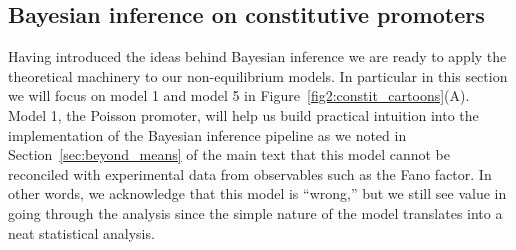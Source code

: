 
\subsection{Bayesian inference on constitutive promoters}
\label{sec:si_bayes_unreg}

Having introduced the ideas behind Bayesian inference we are ready to apply the
theoretical machinery to our non-equilibrium models. In particular in this
section we will focus on model 1 and model 5 in
Figure~\ref{fig2:constit_cartoons}(A). Model 1, the Poisson promoter, will help
us build practical intuition into the implementation of the Bayesian inference
pipeline as we noted in Section~\ref{sec:beyond_means} of the main text that
this model cannot be reconciled with experimental data from observables such as
the Fano factor. In other words, we acknowledge that this model is ``wrong,''
but we still see value in going through the analysis since the simple nature of
the model translates into a neat statistical analysis.

